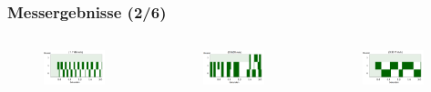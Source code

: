 \documentclass{beamer}
\begin{document}
\begin{frame}
	\frametitle{Messergebnisse (2/6)}
	\begin{columns}
		\begin{figure}
			\includegraphics[width=0.9\textwidth]{img/hum13.png} 
		\end{figure}
		\begin{figure}
			\includegraphics[width=0.9\textwidth]{img/hum15.png}
		\end{figure}
		\begin{figure}
			\includegraphics[width=0.9\textwidth]{img/hum14.png} 

\end{figure}
\end{columns}
\end{frame}
\end{document}
